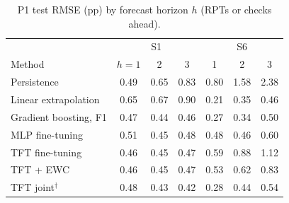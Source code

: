 \begin{table}[t]
  \centering
  \caption{P1 test RMSE (pp) by forecast horizon $h$ (RPTs or checks ahead).}
  \label{tab:horizon}
  \setlength{\tabcolsep}{3.5pt}
  \begin{tabular}{lccc|ccc}
    \toprule
    & \multicolumn{3}{c|}{S1} & \multicolumn{3}{c}{S6} \\
    Method & $h{=}1$ & 2 & 3 & 1 & 2 & 3 \\
    \midrule
    Persistence & 0.49 & 0.65 & 0.83 & 0.80 & 1.58 & 2.38 \\
    Linear extrapolation & 0.65 & 0.67 & 0.90 & 0.21 & 0.35 & 0.46 \\
    Gradient boosting, F1 & 0.47 & 0.44 & 0.46 & 0.27 & 0.34 & 0.50 \\
    MLP fine-tuning & 0.51 & 0.45 & 0.48 & 0.48 & 0.46 & 0.60 \\
    TFT fine-tuning & 0.46 & 0.45 & 0.47 & 0.59 & 0.88 & 1.12 \\
    TFT + EWC & 0.46 & 0.45 & 0.47 & 0.53 & 0.62 & 0.83 \\
    TFT joint$^\dagger$ & 0.48 & 0.43 & 0.42 & 0.28 & 0.44 & 0.54 \\
    \bottomrule
  \end{tabular}
\end{table}
